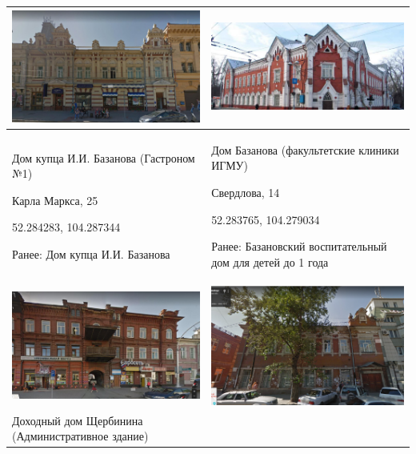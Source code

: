 \begin{longtable}{|p{7.5cm}|p{7.5cm}|}
    \hline
    \includegraphics[width=6.5cm]{2} & \includegraphics[width=7cm]{3} \\
    \hline
    Дом купца И.И. Базанова  (Гастроном №1)

    Карла Маркса, 25 
    
    52.284283, 104.287344
    
    Ранее: Дом купца И.И. Базанова & Дом Базанова (факультетские клиники ИГМУ) 

    Свердлова, 14 

    52.283765, 104.279034

    Ранее: Базановский воспитательный дом для детей до 1 года \\
    \hline
    \includegraphics[width=7cm]{4} & \includegraphics[width=6.5cm]{5} \\
    \hline
    Доходный дом Щербинина (Административное здание)


\end{longtable}
